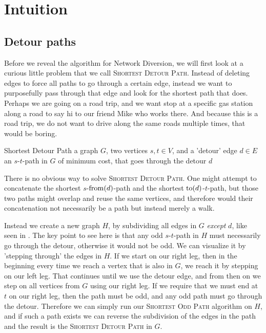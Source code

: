 \section{Intuition}
\subsection{Detour paths}
\label{section:subdividing-detours}
Before we reveal the algorithm for Network Diversion, we will first look at a curious little problem that we call \textsc{Shortest Detour Path}. Instead of deleting edges to force all paths to go through a certain edge, instead we want to purposefully pass through that edge and look for the shortest path that does. Perhaps we are going on a road trip, and we want stop at a specific gas station along a road to say hi to our friend Mike who works there. And because this is a road trip, we do not want to drive along the same roads multiple times, that would be boring.

\problem
{Shortest Detour Path}
{a graph $G$, two vertices $s,t \in V$, and a 'detour' edge $d \in E$}
{an $s$-$t$-path in $G$ of minimum cost, that goes through the detour $d$}

There is no obvious way to solve \textsc{Shortest Detour Path}. One might attempt to concatenate the shortest $s$-$\operatorname{from}(d)$-path and the shortest $\operatorname{to}(d)$-$t$-path, but those two paths might overlap and reuse the same vertices, and therefore would their concatenation not necessarily be a path but instead merely a walk.

Instead we create a new graph $H$, by subdividing all edges in $G$ \emph{except} $d$, like seen in . The key point to see here is that any odd $s$-$t$-path in $H$ must necessarily go through the detour, otherwise it would not be odd. We can visualize it by 'stepping through' the edges in $H$. If we start on our right leg, then in the beginning every time we reach a vertex that is also in $G$, we reach it by stepping on our left leg. That continues until we use the detour edge, and from then on we step on all vertices from $G$ using our right leg. If we require that we must end at $t$ on our right leg, then the path must be odd, and any odd path must go through the detour. Therefore we can simply run our \textsc{Shortest Odd Path} algorithm on $H$, and if such a path exists we can reverse the subdivision of the edges in the path and the result is the \textsc{Shortest Detour Path} in $G$.

